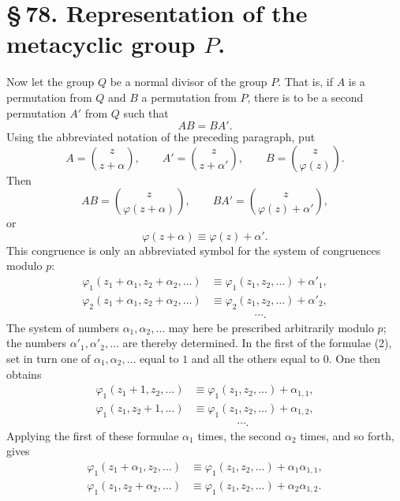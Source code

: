 \documentclass[11pt]{article}
\begin{document}
\section*{\S\,78. Representation of the metacyclic group $P$.}

Now let the group $Q$ be a normal divisor of the group $P$. That is, if $A$ is a permutation from $Q$ and $B$ a permutation from $P$, there is to be a second permutation $A'$ from $Q$ such that
\begin{equation}
 AB=BA'.
 \tag{1}
\end{equation}
Using the abbreviated notation of the preceding paragraph, put
\[
 A=\binom{z}{z+\alpha},\qquad
 A'=\binom{z}{z+\alpha'},\qquad
 B=\binom{z}{\varphi(z)}.
\]
Then
\[
 AB=\binom{z}{\varphi(z+\alpha)},\qquad
 BA'=\binom{z}{\varphi(z)+\alpha'},
\]
or
\[
 \varphi(z+\alpha)\equiv\varphi(z)+\alpha'.
\]
This congruence is only an abbreviated symbol for the system of congruences modulo $p$:
\begin{equation}
\begin{aligned}
 \varphi_1(z_1+\alpha_1,z_2+\alpha_2,\ldots)&\equiv
        \varphi_1(z_1,z_2,\ldots)+\alpha'_1,\\
 \varphi_2(z_1+\alpha_1,z_2+\alpha_2,\ldots)&\equiv
        \varphi_2(z_1,z_2,\ldots)+\alpha'_2,\\
 &\hspace{4em}\cdots .
\end{aligned}
 \tag{2}
\end{equation}
The system of numbers $\alpha_1,\alpha_2,\ldots$ may here be prescribed arbitrarily modulo $p$; the numbers $\alpha'_1,\alpha'_2,\ldots$ are thereby determined. In the first of the formulae (2), set in turn one of $\alpha_1,\alpha_2,\ldots$ equal to $1$ and all the others equal to $0$. One then obtains
\begin{equation}
\begin{aligned}
 \varphi_1(z_1+1,z_2,\ldots)&\equiv\varphi_1(z_1,z_2,\ldots)+\alpha_{1,1},\\
 \varphi_1(z_1,z_2+1,\ldots)&\equiv\varphi_1(z_1,z_2,\ldots)+\alpha_{1,2},\\
 &\hspace{4em}\cdots .
\end{aligned}
 \tag{3}
\end{equation}
Applying the first of these formulae $\alpha_1$ times, the second $\alpha_2$ times, and so forth, gives
\[
\begin{aligned}
 \varphi_1(z_1+\alpha_1,z_2,\ldots)&\equiv
 \varphi_1(z_1,z_2,\ldots)+\alpha_1\alpha_{1,1},\\
 \varphi_1(z_1,z_2+\alpha_2,\ldots)&\equiv
 \varphi_1(z_1,z_2,\ldots)+\alpha_2\alpha_{1,2}.
\end{aligned}
\]
\end{document}
